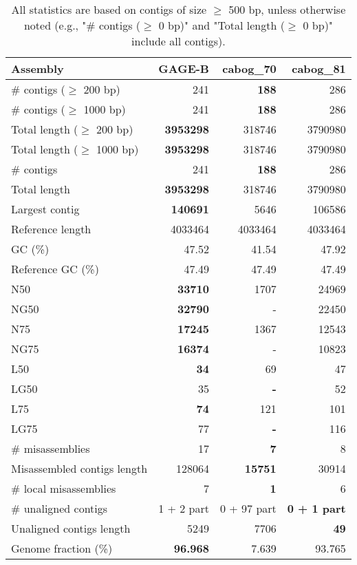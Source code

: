 \documentclass[12pt,a4paper]{article}
\begin{document}
\begin{table}[ht]
\begin{center}
\caption{All statistics are based on contigs of size $\geq$ 500 bp, unless otherwise noted (e.g., "\# contigs ($\geq$ 0 bp)" and "Total length ($\geq$ 0 bp)" include all contigs).}
\begin{tabular}{|l*{3}{|r}|}
\hline
Assembly & GAGE-B & cabog\_70 & cabog\_81 \\ \hline
\# contigs ($\geq$ 200 bp) & 241 & {\bf 188} & 286 \\ \hline
\# contigs ($\geq$ 1000 bp) & 241 & {\bf 188} & 286 \\ \hline
Total length ($\geq$ 200 bp) & {\bf 3953298} & 318746 & 3790980 \\ \hline
Total length ($\geq$ 1000 bp) & {\bf 3953298} & 318746 & 3790980 \\ \hline
\# contigs & 241 & {\bf 188} & 286 \\ \hline
Total length & {\bf 3953298} & 318746 & 3790980 \\ \hline
Largest contig & {\bf 140691} & 5646 & 106586 \\ \hline
Reference length & 4033464 & 4033464 & 4033464 \\ \hline
GC (\%) & 47.52 & 41.54 & 47.92 \\ \hline
Reference GC (\%) & 47.49 & 47.49 & 47.49 \\ \hline
N50 & {\bf 33710} & 1707 & 24969 \\ \hline
NG50 & {\bf 32790} & - & 22450 \\ \hline
N75 & {\bf 17245} & 1367 & 12543 \\ \hline
NG75 & {\bf 16374} & - & 10823 \\ \hline
L50 & {\bf 34} & 69 & 47 \\ \hline
LG50 & 35 & {\bf -} & 52 \\ \hline
L75 & {\bf 74} & 121 & 101 \\ \hline
LG75 & 77 & {\bf -} & 116 \\ \hline
\# misassemblies & 17 & {\bf 7} & 8 \\ \hline
Misassembled contigs length & 128064 & {\bf 15751} & 30914 \\ \hline
\# local misassemblies & 7 & {\bf 1} & 6 \\ \hline
\# unaligned contigs & 1 + 2 part & 0 + 97 part & {\bf 0 + 1 part} \\ \hline
Unaligned contigs length & 5249 & 7706 & {\bf 49} \\ \hline
Genome fraction (\%) & {\bf 96.968} & 7.639 & 93.765 \\ \hline

\end{tabular}
\end{center}
\end{table}
\end{document}

